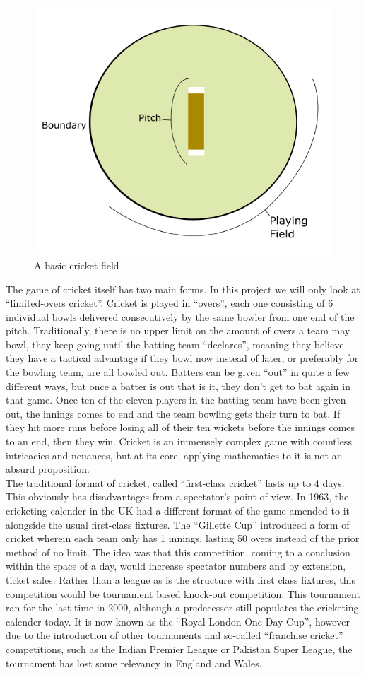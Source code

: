 \begin{figure}[h]
    \label{pitch}
    \centering
    \includegraphics[width=0.7\linewidth]{figures/ptich.png}
    \caption{A basic cricket field}
\end{figure}

The game of cricket itself has two main forms. In this project we will only look at ``limited-overs cricket''. Cricket is played in ``overs'', each one consisting of 6 individual bowls delivered consecutively by the same bowler from one end of the pitch.
 Traditionally, there is no upper limit on the amount of overs a team may bowl, they keep going until the batting team ``declares'', meaning they believe they have a tactical advantage if they bowl now instead of later, or preferably for the bowling team, are all bowled out. 
Batters can be given ``out'' in quite a few different ways, but once a batter is out that is it, they don't get to bat again in that game. Once ten of the eleven players in the batting team have been given out, the innings comes to end and the team bowling 
gets their turn to bat. If they hit more runs before losing all of their ten wickets before the innings comes to an end, then they win. Cricket is an immensely complex game with countless intricacies and neuances, but at 
its core, applying mathematics to it is not an absurd proposition. \\

The traditional format of cricket, called ``first-class cricket'' lasts up to 4 days. This obviously has disadvantages from a spectator's point of view. 
In 1963, the cricketing calender in the UK had a different format of the game amended to it alongside the usual first-class fixtures.
The ``Gillette Cup'' introduced a form of cricket wherein each team only has 1 innings, lasting 50 overs instead of the prior method of no limit. The idea was 
that this competition, coming to a conclusion within the space of a day, would increase spectator numbers and by extension, ticket sales.  Rather than a league 
as is the structure with first class fixtures, this competition would be tournament based knock-out competition. This tournament ran for the last time in 2009, although 
a predecessor still populates the cricketing calender today. It is now known as the ``Royal London One-Day Cup'', however due to the introduction of other tournaments 
and so-called ``franchise cricket'' competitions, such as the Indian Premier League or Pakistan Super League,  the tournament has lost some relevancy in England and Wales. \\

